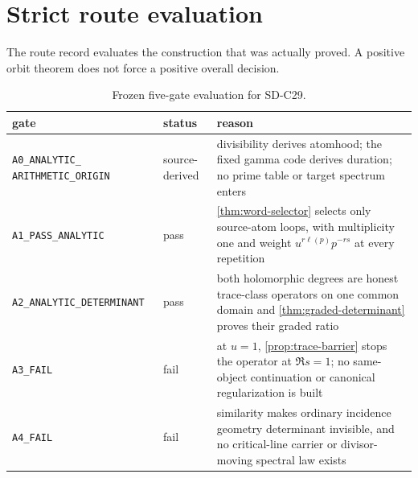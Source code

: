\section{Strict route evaluation}
\label{sec:route}

The route record evaluates the construction that was actually proved. A
positive orbit theorem does not force a positive overall decision.

\begin{table}[H]
\centering
\footnotesize
\caption{Frozen five-gate evaluation for SD-C29.}
\label{tab:route}
\begin{tabularx}{\textwidth}{L{42mm} L{27mm} Y}
\toprule
gate & status & reason \\
\midrule
\texttt{A0\_ANALYTIC\_}\newline
\texttt{ARITHMETIC\_ORIGIN}
& \textcolor{passgreen}{source-derived}
& divisibility derives atomhood; the fixed gamma code derives duration; no
prime table or target spectrum enters \\
\nolinkurl{A1_PASS_ANALYTIC}
& \textcolor{passgreen}{pass}
& \cref{thm:word-selector} selects only source-atom loops, with multiplicity
one and weight \(u^{r\ell(p)}p^{-rs}\) at every repetition \\
\nolinkurl{A2_ANALYTIC_DETERMINANT}
& \textcolor{passgreen}{pass}
& both holomorphic degrees are honest trace-class operators on one common
domain and \cref{thm:graded-determinant} proves their graded ratio \\
\nolinkurl{A3_FAIL}
& \textcolor{stopred}{fail}
& at \(u=1\), \cref{prop:trace-barrier} stops the operator at \(\Re s=1\);
no same-object continuation or canonical regularization is built \\
\nolinkurl{A4_FAIL}
& \textcolor{stopred}{fail}
& similarity makes ordinary incidence geometry determinant invisible, and no
critical-line carrier or divisor-moving spectral law exists \\
\bottomrule
\end{tabularx}
\end{table}

\begin{center}
\end{center}

